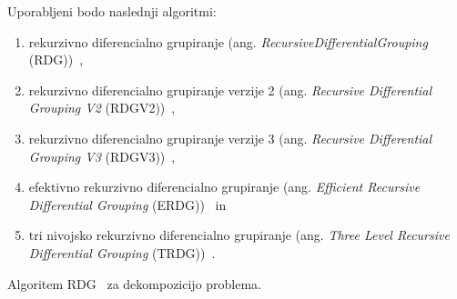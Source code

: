 Uporabljeni bodo naslednji algoritmi:
\begin{enumerate}
    \item rekurzivno diferencialno grupiranje (ang. \textit{RecursiveDifferentialGrouping} (RDG))~\cite{alg:rdg},
    \item rekurzivno diferencialno grupiranje verzije 2 (ang. \textit{Recursive Differential Grouping V2} (RDGV2))~\cite{alg:rdg2},
    \item rekurzivno diferencialno grupiranje verzije 3 (ang. \textit{Recursive Differential Grouping V3} (RDGV3))~\cite{alg:rdg3},
    \item efektivno rekurzivno diferencialno grupiranje (ang. \textit{Efficient Recursive Differential Grouping} (ERDG))~\cite{alg:erdg} in
    \item tri nivojsko rekurzivno diferencialno grupiranje (ang. \textit{Three Level Recursive Differential Grouping} (TRDG))~\cite{alg:trdg}.
\end{enumerate}

\begin{algorithm}
    \DontPrintSemicolon


    \caption{Algoritem RDG~\cite{alg:rdg} za dekompozicijo problema.}
    \label{pcode:rdg}
\end{algorithm}

